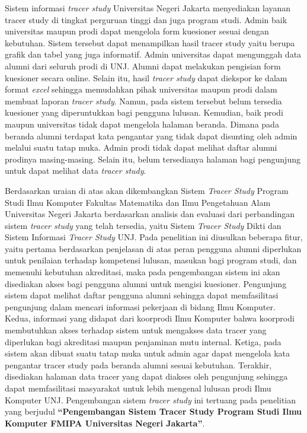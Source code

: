Sistem informasi \textit{tracer study} Universitas Negeri Jakarta menyediakan layanan tracer study di tingkat perguruan tinggi dan juga program studi. Admin baik universitas maupun prodi dapat mengelola form kuesioner sesuai dengan kebutuhan. Sistem tersebut dapat menampilkan hasil tracer study yaitu berupa grafik dan tabel yang juga informatif. Admin universitas dapat mengunggah data alumni dari seluruh prodi di UNJ. Alumni dapat melakukan pengisian form kuesioner secara online. Selain itu, hasil\textit{ tracer study} dapat diekspor ke dalam format \textit{excel} sehingga memudahkan pihak universitas maupun prodi dalam membuat laporan \textit{tracer study}. Namun, pada sistem tersebut belum tersedia kuesioner yang diperuntukkan bagi pengguna lulusan. Kemudian, baik prodi maupun universitas tidak dapat mengelola halaman beranda. Dimana pada beranda alumni terdapat kata pengantar yang tidak dapat disunting oleh admin melalui suatu tatap muka. Admin prodi tidak dapat melihat daftar alumni prodinya masing-masing. Selain itu, belum tersedianya halaman bagi pengunjung untuk dapat melihat data \textit{tracer study}. 

Berdasarkan uraian di atas akan dikembangkan Sistem \textit{Tracer Study} Program Studi Ilmu Komputer Fakultas Matematika dan Ilmu Pengetahuan Alam Universitas Negeri Jakarta berdasarkan analisis dan evaluasi dari perbandingan sistem \textit{tracer study} yang telah tersedia, yaitu Sistem \textit{Tracer Study} Dikti dan Sistem Informasi \textit{Tracer Study} UNJ. Pada penelitian ini diusulkan beberapa fitur, yaitu pertama berdasarkan penjelasan di atas peran pengguna alumni diperlukan untuk penilaian terhadap kompetensi lulusan, masukan bagi program studi, dan memenuhi kebutuhan akreditasi, maka pada pengembangan sistem ini akan disediakan akses bagi pengguna alumni untuk mengisi kuesioner. Pengunjung sistem dapat melihat daftar pengguna alumni sehingga dapat memfasilitasi pengunjung dalam mencari informasi pekerjaan di bidang Ilmu Komputer. Kedua, informasi yang didapat dari koorprodi Ilmu Komputer bahwa koorprodi membutuhkan akses terhadap sistem untuk mengakses data tracer yang diperlukan bagi akreditasi maupun penjaminan mutu internal. Ketiga, pada sistem akan dibuat suatu tatap muka untuk admin agar dapat mengelola kata pengantar tracer study pada beranda alumni sesuai kebutuhan. Terakhir, disediakan halaman data tracer yang dapat diakses oleh pengunjung sehingga dapat memfasilitasi masyarakat untuk lebih mengenal lulusan prodi Ilmu Komputer UNJ. Pengembangan sistem \textit{tracer study} ini tertuang pada penelitian yang berjudul \textbf{“Pengembangan Sistem Tracer Study Program Studi Ilmu Komputer FMIPA Universitas Negeri Jakarta”}.

